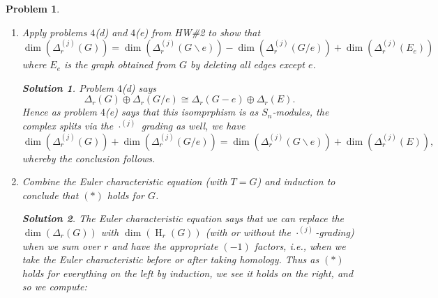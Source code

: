\documentclass{article}
\theoremstyle{normal}
\newtheorem{problem}{Problem}
\theoremstyle{thmit}
\newtheorem*{solution}{Solution}
\begin{document}
\begin{problem}

\begin{enumerate}[label = (\alph*)]
    \item Apply problems $4$(d) and $4$(e) from HW\#2 to show that \[\dim\left(\Delta_r^{(j)}(G) \right) = \dim\left(\Delta_r^{(j)}(G\smallsetminus e) \right)-\dim\left( \Delta_r^{(j)}(G/e) \right) +\dim\left( \Delta_r^{(j)} (E_e) \right) \]
    where $E_e$ is the graph obtained from $G$ by deleting all edges except $e$. 
    
    \begin{solution}
    Problem $4$(d) says \[\Delta_r(G) \oplus \Delta_r(G/e)\cong \Delta_r(G-e)\oplus\Delta_r(E).\] Hence as problem $4$(e) says that this isomprphism is as $S_n$-modules, the complex splits via the ${\cdot}^{(j)}$ grading as well, we have \[\dim \left(\Delta_r^{(j)}(G) \right) + \dim\left( \Delta_r^{(j)}(G/e) \right) = \dim\left( \Delta_r^{(j)}(G\smallsetminus e)\right) +\dim\left(\Delta_r^{(j)}(E)\right),\] whereby the conclusion follows.
    
    
    
    
    
    
    \end{solution}
    
    \item Combine the Euler characteristic equation (with $T=G$) and induction to conclude that $(\ast)$ holds for $G$. 
    
    \begin{solution}
    The Euler characteristic equation says that we can replace the $\dim\left( \Delta_r(G)\right)$ with $\dim\left( \operatorname{H}_r(G)\right)$ (with or without the ${\cdot}^{(j)}$-grading) when we sum over $r$ and have the appropriate $(-1)$ factors, i.e., when we take the Euler characteristic before or after taking homology. Thus as $(\ast)$ holds for everything on the left by induction, we see it holds on the right, and so we compute:
    

\end{solution}
\end{enumerate}
\end{problem}
\end{document}
